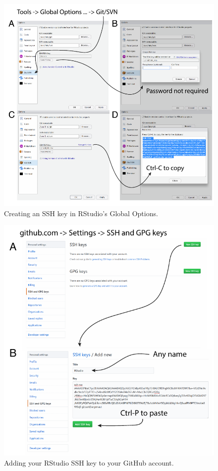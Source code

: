 \documentclass[
  12pt,
  krantz2]{krantz}
\begin{document}
\begin{figure}
\centering
\includegraphics{images/chapter14/1.pdf}
\caption{\label{fig:chap14-fig-ssh}Creating an SSH key in RStudio's Global Options.}
\end{figure}

\begin{figure}
\centering
\includegraphics{images/chapter14/2.pdf}
\caption{\label{fig:chap14-fig-github}Adding your RStudio SSH key to your GitHub account.}
\end{figure}
\end{document}
